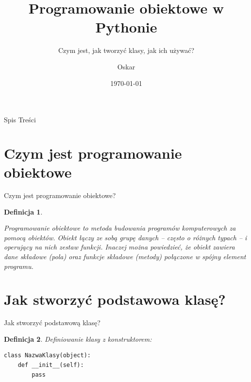 \documentclass{beamer}
\title{Programowanie obiektowe w Pythonie}
\subtitle{Czym jest, jak tworzyć klasy, jak ich używać?}
\author{Oskar}
\date{\today}
\newtheorem{twierdzenieBlok}{Definicja}
\begin{document}
\begin{frame}
    \titlepage
\end{frame}

\begin{frame}{Spis Treści}
	\begin{Center}
	\end{Center}
\end{frame}

\section{Czym jest programowanie obiektowe}
\begin{frame}{Czym jest programowanie obiektowe?}
	    	\begin{twierdzenieBlok}
		    	\begin{Center}
			\footnotesize Programowanie obiektowe to metoda budowania programów komputerowych za pomocą obiektów. Obiekt łączy ze sobą grupę danych – często o różnych typach – i operujący na nich zestaw funkcji. Inaczej można powiedzieć, że obiekt zawiera dane składowe (pola) oraz funkcje składowe (metody) połączone w spójny element programu.
			\end{Center}
		\end{twierdzenieBlok}
\end{frame}

\section{Jak stworzyć podstawowa klasę?}
\begin{frame}[fragile]{Jak stworzyć podstawową klasę?}
	\begin{twierdzenieBlok}
		\footnotesize Definiowanie klasy z konstruktorem:
  		\scriptsize
		\begin{verbatim}
class NazwaKlasy(object):
	def __init__(self):
		pass
		\end{verbatim}
	\end{twierdzenieBlok}
\end{frame}


\end{document}
